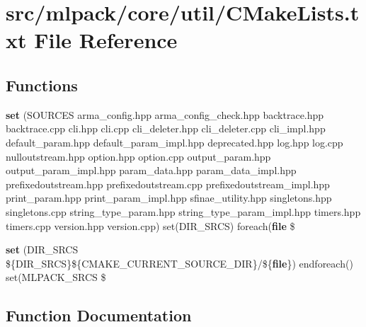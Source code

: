 \section{src/mlpack/core/util/\+C\+Make\+Lists.txt File Reference}
\label{core_2util_2CMakeLists_8txt}
\subsection*{Functions}
\begin{DoxyCompactItemize}
\item 
{\bf set} (S\+O\+U\+R\+C\+ES arma\+\_\+config.\+hpp arma\+\_\+config\+\_\+check.\+hpp backtrace.\+hpp backtrace.\+cpp cli.\+hpp cli.\+cpp cli\+\_\+deleter.\+hpp cli\+\_\+deleter.\+cpp cli\+\_\+impl.\+hpp default\+\_\+param.\+hpp default\+\_\+param\+\_\+impl.\+hpp deprecated.\+hpp log.\+hpp log.\+cpp nulloutstream.\+hpp option.\+hpp option.\+cpp output\+\_\+param.\+hpp output\+\_\+param\+\_\+impl.\+hpp param\+\_\+data.\+hpp param\+\_\+data\+\_\+impl.\+hpp prefixedoutstream.\+hpp prefixedoutstream.\+cpp prefixedoutstream\+\_\+impl.\+hpp print\+\_\+param.\+hpp print\+\_\+param\+\_\+impl.\+hpp sfinae\+\_\+utility.\+hpp singletons.\+hpp singletons.\+cpp string\+\_\+type\+\_\+param.\+hpp string\+\_\+type\+\_\+param\+\_\+impl.\+hpp timers.\+hpp timers.\+cpp version.\+hpp version.\+cpp) set(D\+I\+R\+\_\+\+S\+R\+CS) foreach({\bf file} \$
\item 
{\bf set} (D\+I\+R\+\_\+\+S\+R\+CS \$\{D\+I\+R\+\_\+\+S\+R\+CS\}\$\{C\+M\+A\+K\+E\+\_\+\+C\+U\+R\+R\+E\+N\+T\+\_\+\+S\+O\+U\+R\+C\+E\+\_\+\+D\+IR\}/\$\{{\bf file}\}) endforeach() set(M\+L\+P\+A\+C\+K\+\_\+\+S\+R\+CS \$
\end{DoxyCompactItemize}


\subsection{Function Documentation}
